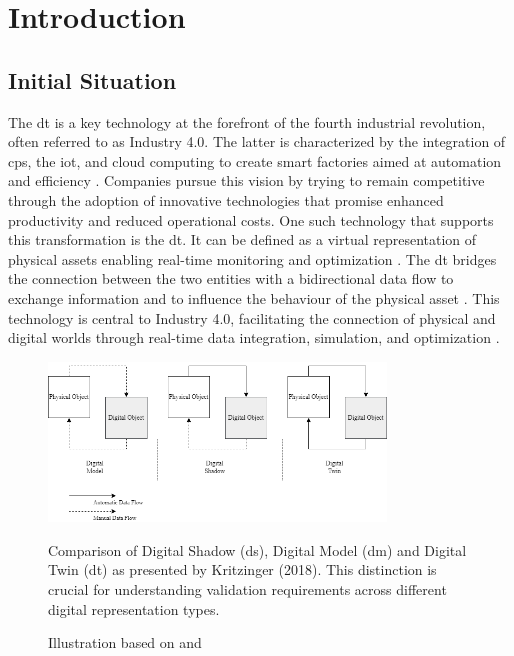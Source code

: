 \chapter{Introduction}
\label{chap:introduction}

\section{Initial Situation}
The \gls{dt} is a key technology at the forefront of the fourth industrial revolution, often referred to as Industry 4.0.
The latter is characterized by the integration of \gls{cps}, the \gls{iot}, and cloud computing to create smart factories aimed at automation and efficiency \autocite{Oztemel2020}. Companies pursue this vision by trying to remain competitive through the adoption of innovative technologies that promise enhanced productivity and reduced operational costs. One such technology that supports this transformation is the \gls{dt}. It can be defined as a virtual representation of physical assets enabling real-time monitoring and optimization \autocite{Tao2018ijamt}. The \gls{dt} bridges the connection between the two entities with a bidirectional data flow to exchange information and to influence the behaviour of the physical asset \autocite{grieves2014digital}. This technology is central to Industry 4.0, facilitating the connection of physical and digital worlds through real-time data integration, simulation, and optimization \autocite{judijanto2024trends}.


\begin{figure}[htbp]
  \centering
  \includegraphics[width=0.8\textwidth]{figures/kritzinger.png}
  \caption[The different Types of Digital Models.]{Comparison of Digital Shadow (\gls{ds}), Digital Model (\gls{dm}) and Digital Twin (\gls{dt}) as presented by Kritzinger (2018). This distinction is crucial for understanding validation requirements across different digital representation types.}
  \label{fig:Kritzinger}
  \caption*{Illustration based on \textcite{kritzinger2018digital} and \textcite{Zhang2021jmsy}}
\end{figure}

